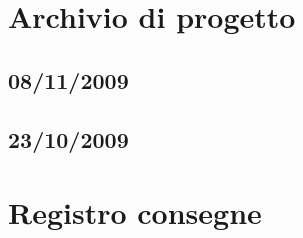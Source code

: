 \documentclass[a4paper, 12pt]{report}
\begin{document}
\tableofcontents

\newpage



\chapter{Archivio di progetto}

\section{08/11/2009}





\section{23/10/2009}




\chapter{Registro consegne}
%
\end{document}
